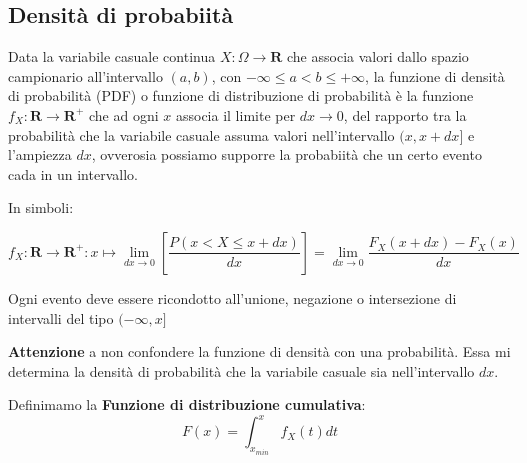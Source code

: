 \documentclass{article}
\theoremstyle{remark}
\begin{document}
\subsection{Densità di probabiità}

 Data la variabile casuale continua \( X: \Omega \to \mathbf{R} \) che associa valori dallo spazio campionario all'intervallo 
 \((a, b)\), con \( -\infty \leq a < b \leq +\infty \), la funzione di densità di probabilità (PDF) o funzione di distribuzione di probabilità è 
 la funzione \( f_X: \mathbf{R} \to \mathbf{R}^+ \) che ad ogni \( x \) associa il limite per \( dx \rightarrow 0\), del rapporto tra la probabilità 
 che la variabile casuale assuma valori nell'intervallo \((x, x + dx]\) e l'ampiezza \( dx \), ovverosia possiamo supporre la probabiità che un certo 
 evento cada in un intervallo.

 In simboli:
 
 \[ f_X: \mathbf{R} \to \mathbf{R}^+ : x \mapsto \lim_{dx \to 0} \left[ \frac{P(x < X \leq x + dx)}{dx} \right] = \lim_{dx \to 0} \frac{F_X(x+dx)- F_X(x)}{dx}\]

 Ogni evento deve essere ricondotto all'unione, negazione o intersezione di intervalli del tipo $( -\infty, x] $

 \textbf{Attenzione} a non confondere la funzione di densità con una probabilità.
 Essa mi determina la densità di probabilità che la variabile casuale sia nell'intervallo $dx$.

 Definimamo la \textbf{Funzione di distribuzione cumulativa}:
 \[
 F(x)=\int_{x_{min}}^x f_X(t)dt
 \]


\begin{center}
\end{center}
\end{document}
